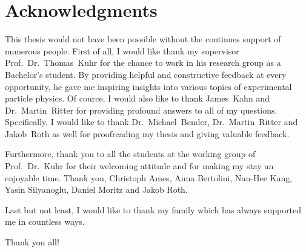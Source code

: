 \thispagestyle{empty}
\chapter*{Acknowledgments}

This thesis would not have been possible without the continues support of numerous people. First of all, I would like thank my supervisor Prof.~Dr.~Thomas~Kuhr for the chance to work in his research group as a Bachelor's student. By providing helpful and constructive feedback at every opportunity, he gave me inspiring insights into various topics of experimental particle physics. Of cource, I would also like to thank James~Kahn and Dr.~Martin~Ritter for providing profound answers to all of my questions.
Specifically, I would like to thank Dr.~Michael~Bender, Dr.~Martin~Ritter and Jakob~Roth as well for proofreading my thesis and giving valuable feedback.

Furthermore, thank you to all the students at the working group of Prof.~Dr.~Kuhr for their welcoming attitude and for making my stay an enjoyable time. Thank you, Christoph Ames, Anna Bertolini, Nan-Hee Kang, Yasin Silyanoglu, Daniel Moritz and Jakob Roth.

Last but not least, I would like to thank my family which has always supported me in countless ways.

Thank you all!
